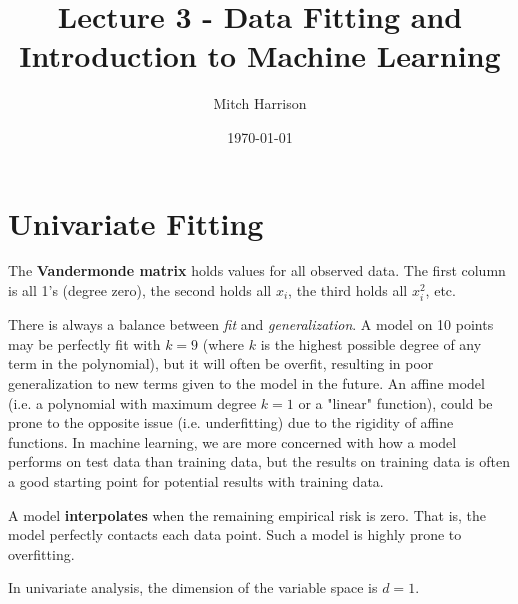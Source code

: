 \documentclass[titlepage, 12pt, leqno]{article}
\title{\Huge{Lecture 3 - Data Fitting and Introduction to Machine Learning}}
\author{\large{Mitch Harrison}}
\date{\today}
\begin{document}
\setlength{\parskip}{1\baselineskip}
\setlength{\parindent}{15pt}
\maketitle
\tableofcontents
\newpage


\section{Univariate Fitting}

\begin{definition}
    The \textbf{Vandermonde matrix} holds values for all observed data. The first
    column is all 1's (degree zero), the second holds all $x_i$, the third holds
    all $x_i^{2}$, etc.
\end{definition}

There is always a balance between \textit{fit} and \textit{generalization}. A 
model on 10 points may be perfectly fit with $k=9$ (where $k$ is the highest 
possible degree of any term in the polynomial), but it will often be overfit,
resulting in poor generalization to new terms given to the model in the future. An
affine model (i.e. a polynomial with maximum degree $k=1$ or a "linear" 
function), could be prone to the opposite issue (i.e. underfitting) due to the
rigidity of affine functions. In machine learning, we are more concerned with how
a model performs on test data than training data, but the results on training data
is often a good starting point for potential results with training data.

\begin{definition}
    A model \textbf{interpolates} when the remaining empirical risk is zero. That
    is, the model perfectly contacts each data point. Such a model is highly prone
    to overfitting.
\end{definition}

In univariate analysis, the dimension of the variable space is $d=1$.

\pagebreak
\end{document}
